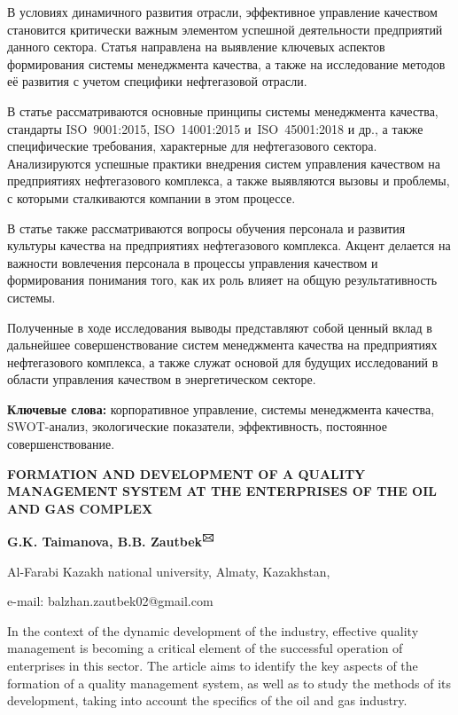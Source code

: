 В условиях динамичного развития отрасли, эффективное управление
качеством становится критически важным элементом успешной деятельности
предприятий данного сектора. Статья направлена на выявление ключевых
аспектов формирования системы менеджмента качества, а также на
исследование методов её развития с учетом специфики нефтегазовой
отрасли.

В статье рассматриваются основные принципы системы менеджмента качества,
стандарты ISO~9001:2015, ISO~14001:2015 и~ISO~45001:2018 и др., а также
специфические требования, характерные для нефтегазового сектора.
Анализируются успешные практики внедрения систем управления качеством на
предприятиях нефтегазового комплекса, а также выявляются вызовы и
проблемы, с которыми сталкиваются компании в этом процессе.

В статье также рассматриваются вопросы обучения персонала и развития
культуры качества на предприятиях нефтегазового комплекса. Акцент
делается на важности вовлечения персонала в процессы управления
качеством и формирования понимания того, как их роль влияет на общую
результативность системы.

Полученные в ходе исследования выводы представляют собой ценный вклад в
дальнейшее совершенствование систем менеджмента качества на предприятиях
нефтегазового комплекса, а также служат основой для будущих исследований
в области управления качеством в энергетическом секторе.

{\bfseries Ключевые слова:} корпоративное управление, системы менеджмента
качества, SWOT-анализ, экологические показатели, эффективность,
постоянное совершенствование.

\begin{center}
{\large\bfseries FORMATION AND DEVELOPMENT OF A QUALITY MANAGEMENT SYSTEM AT THE
ENTERPRISES OF THE OIL AND GAS COMPLEX}

{\bfseries G.K. Taimanova, B.B. Zautbek\textsuperscript{🖂}}

Al-Farabi Kazakh national university, Almaty, Kazakhstan,

e-mail: balzhan.zautbek02@gmail.com
\end{center}

In the context of the dynamic development of the industry, effective
quality management is becoming a critical element of the successful
operation of enterprises in this sector. The article aims to identify
the key aspects of the formation of a quality management system, as well
as to study the methods of its development, taking into account the
specifics of the oil and gas industry.

